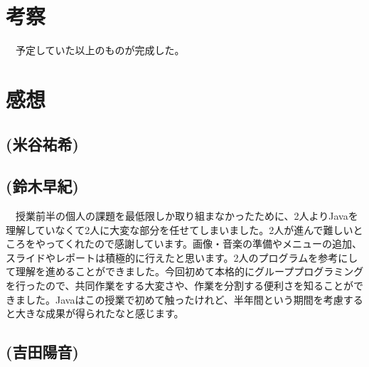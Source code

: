 \documentclass[a4j]{jarticle} %
\begin{document}
\begin{figure}[H]
  \begin{center}
  \end{center}
\end{figure}

\section{考察}
　予定していた以上のものが完成した。%

\section{感想}
\subsection*{(米谷祐希)}
\subsection*{(鈴木早紀)}
　授業前半の個人の課題を最低限しか取り組まなかったために、2人よりJavaを理解していなくて2人に大変な部分を任せてしまいました。2人が進んで難しいところをやってくれたので感謝しています。画像・音楽の準備やメニューの追加、スライドやレポートは積極的に行えたと思います。2人のプログラムを参考にして理解を進めることができました。今回初めて本格的にグループプログラミングを行ったので、共同作業をする大変さや、作業を分割する便利さを知ることができました。Javaはこの授業で初めて触ったけれど、半年間という期間を考慮すると大きな成果が得られたなと感じます。
\subsection*{(吉田陽音)}
\end{document}
